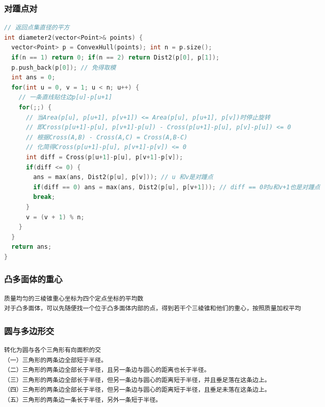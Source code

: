 \documentclass[landscape,a4paper]{article}
\begin{document}
\begin{spacing}{0.3}
\begin{multicols}{3}
\subsubsection{对踵点对}
\begin{lstlisting}[language=C++]
// 返回点集直径的平方
int diameter2(vector<Point>& points) {
  vector<Point> p = ConvexHull(points); int n = p.size();
  if(n == 1) return 0; if(n == 2) return Dist2(p[0], p[1]);
  p.push_back(p[0]); // 免得取模
  int ans = 0;
  for(int u = 0, v = 1; u < n; u++) {
    // 一条直线贴住边p[u]-p[u+1]
    for(;;) {
      // 当Area(p[u], p[u+1], p[v+1]) <= Area(p[u], p[u+1], p[v])时停止旋转
      // 即Cross(p[u+1]-p[u], p[v+1]-p[u]) - Cross(p[u+1]-p[u], p[v]-p[u]) <= 0
      // 根据Cross(A,B) - Cross(A,C) = Cross(A,B-C)
      // 化简得Cross(p[u+1]-p[u], p[v+1]-p[v]) <= 0
      int diff = Cross(p[u+1]-p[u], p[v+1]-p[v]);
      if(diff <= 0) {
        ans = max(ans, Dist2(p[u], p[v])); // u 和v是对踵点
        if(diff == 0) ans = max(ans, Dist2(p[u], p[v+1])); // diff == 0时u和v+1也是对踵点
        break;
      }
      v = (v + 1) % n;
    }
  }
  return ans;
}
\end{lstlisting}
\subsubsection{凸多面体的重心}
\begin{lstlisting}[language=C++]
质量均匀的三棱锥重心坐标为四个定点坐标的平均数
对于凸多面体，可以先随便找一个位于凸多面体内部的点，得到若干个三棱锥和他们的重心，按照质量加权平均
\end{lstlisting}
\subsubsection{圆与多边形交}
\begin{lstlisting}[language=C++]
转化为圆与各个三角形有向面积的交
（一）三角形的两条边全部短于半径。
（二）三角形的两条边全部长于半径，且另一条边与圆心的距离也长于半径。
（三）三角形的两条边全部长于半径，但另一条边与圆心的距离短于半径，并且垂足落在这条边上。
（四）三角形的两条边全部长于半径，但另一条边与圆心的距离短于半径，且垂足未落在这条边上。
（五）三角形的两条边一条长于半径，另外一条短于半径。
\end{lstlisting}

\end{multicols}
\end{spacing}
\end{document}
